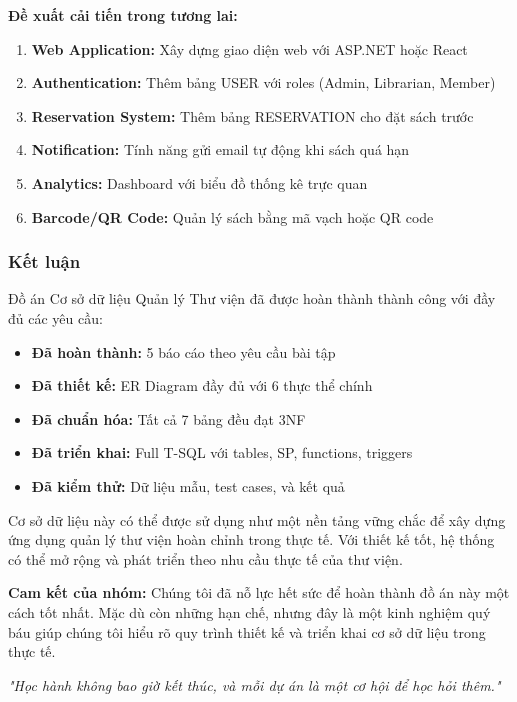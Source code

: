 \documentclass[12pt,a4paper]{article}
\begin{document}
\textbf{Đề xuất cải tiến trong tương lai:}
\begin{enumerate}
    \item \textbf{Web Application:} Xây dựng giao diện web với ASP.NET hoặc React
    \item \textbf{Authentication:} Thêm bảng USER với roles (Admin, Librarian, Member)
    \item \textbf{Reservation System:} Thêm bảng RESERVATION cho đặt sách trước
    \item \textbf{Notification:} Tính năng gửi email tự động khi sách quá hạn
    \item \textbf{Analytics:} Dashboard với biểu đồ thống kê trực quan
    \item \textbf{Barcode/QR Code:} Quản lý sách bằng mã vạch hoặc QR code
\end{enumerate}

\subsubsection{Kết luận}

Đồ án Cơ sở dữ liệu Quản lý Thư viện đã được hoàn thành thành công với đầy đủ các yêu cầu:

\begin{itemize}
    \item \textbf{Đã hoàn thành:} 5 báo cáo theo yêu cầu bài tập
    \item \textbf{Đã thiết kế:} ER Diagram đầy đủ với 6 thực thể chính
    \item \textbf{Đã chuẩn hóa:} Tất cả 7 bảng đều đạt 3NF
    \item \textbf{Đã triển khai:} Full T-SQL với tables, SP, functions, triggers
    \item \textbf{Đã kiểm thử:} Dữ liệu mẫu, test cases, và kết quả
\end{itemize}

Cơ sở dữ liệu này có thể được sử dụng như một nền tảng vững chắc để xây dựng ứng dụng quản lý thư viện hoàn chỉnh trong thực tế. Với thiết kế tốt, hệ thống có thể mở rộng và phát triển theo nhu cầu thực tế của thư viện.

\textbf{Cam kết của nhóm:} Chúng tôi đã nỗ lực hết sức để hoàn thành đồ án này một cách tốt nhất. Mặc dù còn những hạn chế, nhưng đây là một kinh nghiệm quý báu giúp chúng tôi hiểu rõ quy trình thiết kế và triển khai cơ sở dữ liệu trong thực tế.

\textit{"Học hành không bao giờ kết thúc, và mỗi dự án là một cơ hội để học hỏi thêm."}
\end{document}
